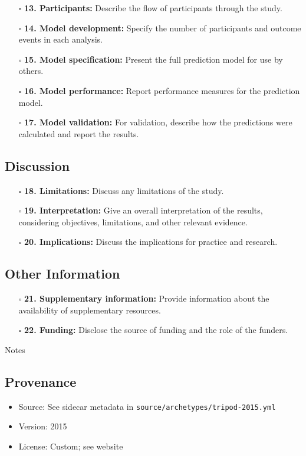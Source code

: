 \documentclass[11pt]{article}
\def\tightlist{}
\begin{document}
\begin{Form}
\begin{itemize}
\tightlist
\item[$\square$]
  \textbf{13. Participants:} Describe the flow of participants through
  the study.
\item[$\square$]
  \textbf{14. Model development:} Specify the number of participants and
  outcome events in each analysis.
\item[$\square$]
  \textbf{15. Model specification:} Present the full prediction model
  for use by others.
\item[$\square$]
  \textbf{16. Model performance:} Report performance measures for the
  prediction model.
\item[$\square$]
  \textbf{17. Model validation:} For validation, describe how the
  predictions were calculated and report the results.
\end{itemize}

\subsection{Discussion}\label{discussion}

\begin{itemize}
\tightlist
\item[$\square$]
  \textbf{18. Limitations:} Discuss any limitations of the study.
\item[$\square$]
  \textbf{19. Interpretation:} Give an overall interpretation of the
  results, considering objectives, limitations, and other relevant
  evidence.
\item[$\square$]
  \textbf{20. Implications:} Discuss the implications for practice and
  research.
\end{itemize}

\subsection{Other Information}\label{other-information}

\begin{itemize}
\tightlist
\item[$\square$]
  \textbf{21. Supplementary information:} Provide information about the
  availability of supplementary resources.
\item[$\square$]
  \textbf{22. Funding:} Disclose the source of funding and the role of
  the funders.
\end{itemize}

{Notes}

\subsection{Provenance}\label{provenance}

\begin{itemize}
\tightlist
\item
  Source: See sidecar metadata in
  \texttt{source/archetypes/tripod-2015.yml}
\item
  Version: 2015
\item
  License: Custom; see website
\end{itemize}

\end{Form}
\end{document}
